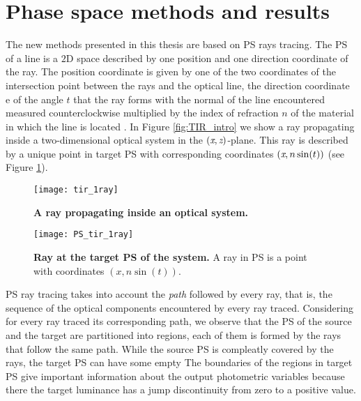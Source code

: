 \section{Phase space methods and results}
The new methods presented in this thesis are based on PS rays tracing. The PS of a line is a $2$D space described by one position and one direction coordinate of the ray. 
The position coordinate is given by one of the two coordinates of the intersection point between the rays and the optical line, the direction coordinate 
e of the angle $t$ that the ray forms with the normal of the line encountered measured counterclockwise multiplied by the index of refraction $n$ of the material in which the line is located \cite{wolf2004geometric}. In Figure \ref{fig:TIR_intro} we show a ray propagating inside a two-dimensional optical system in the $(\textit{x}, \textit{z})$-plane. This ray is described by a unique point in target PS with corresponding coordinates $(\textit{x}, n\sin(t))$ (see Figure \ref{fig:PS_intro}).
\begin{figure}[t]
  \begin{minipage}[t]{0.49\textwidth}
    \texttt{[image: tir\_1ray]}
    \caption{\textbf{A ray propagating inside an optical system.}}
    \label{fig:TIR_intro}
  \end{minipage}
\hfill
  \begin{minipage}[t]{0.49\textwidth}
    \texttt{[image: PS\_tir\_1ray]}
  \caption{\textbf{Ray at the target PS of the system.} A ray in PS is a point with coordinates $(x, n\sin(t))$.}
\label{fig:PS_intro}
 \end{minipage}
\end{figure}
PS ray tracing takes into account the \textit{path} followed by every ray, that is, the sequence of the optical components encountered by every ray traced.
Considering for every ray traced its corresponding path, we observe that the PS of the source and the target are partitioned into regions, each of them is formed by the rays that follow the same path. 
While the source PS is compleatly covered by the rays, the target PS can have some empty  The boundaries of the regions in target PS give important information about the output photometric variables because there the target luminance has a jump discontinuity from zero to a positive value. 
